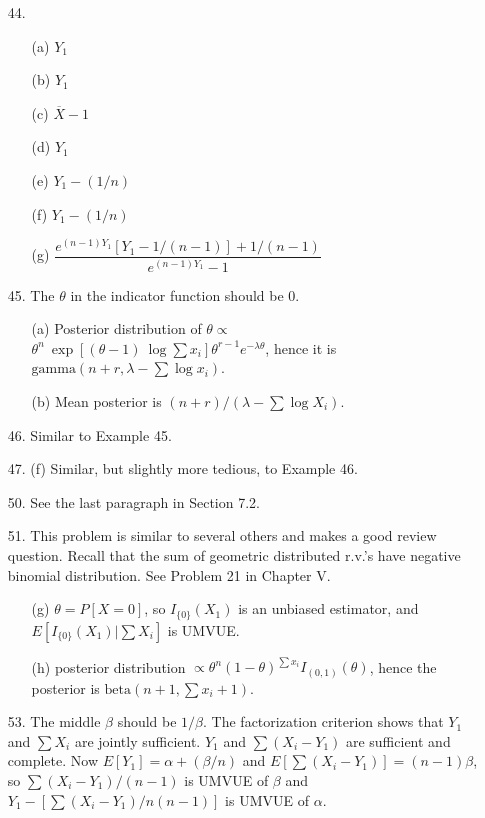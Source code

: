\begin{enumerate}
	\item[44.] \begin{enumerate}
		\item[(a)] $Y_1$
		\item[(b)] $Y_1$
		\item[(c)] $\overline{X}-1$
		\item[(d)] $Y_1$
		\item[(e)] $Y_1 - (1/n)$
		\item[(f)] $Y_1 - (1/n)$
		\item[(g)] $\dfrac{e^{(n-1)Y_1}[Y_1-1/(n-1)] + 1/(n-1)}{e^{(n-1)Y_1} - 1}$
	\end{enumerate}

	\newpage
	
	\item[45.] The $\theta$ in the indicator function should be 0.
	\begin{enumerate}
		\item[(a)] Posterior distribution of $\theta \propto$ \\
		$ \theta^n\ \exp[(\theta-1)\ \log\sum x_i]\theta^{r-1}e^{-\lambda\theta}$, hence it is $\mbox{gamma}(n+r, \lambda-\sum \log x_i)$.
		\item[(b)] Mean posterior is $(n+r)/(\lambda - \sum\log X_i)$. 
	\end{enumerate}
  
  	\item[46.] Similar to Example 45.
  	
  	\item[47.] (f) Similar, but slightly more tedious, to Example 46. 
  	
  	\item[50.] See the last paragraph in Section 7.2.	
  
    \item[51.] This problem is similar to several others and makes a good review question.  Recall that the sum of geometric distributed r.v.'s have negative binomial distribution. See Problem 21 in Chapter V.
    \begin{enumerate}
    	\item[(g)] $\theta=P[X=0]$, so $I_{\{0\}}(X_1)$ is an unbiased estimator, and $E[I_{\{0\}}(X_1)\vert \sum X_i]$ is UMVUE.
    	\item[(h)] posterior distribution $\propto \theta^n(1-\theta)^{\sum x_i}I_{(0,1)}(\theta)$, hence the posterior is $\mbox{beta}(n+1, \sum x_i +1)$.
    \end{enumerate}	
  
    \item[53.] The middle $\beta$ should be $1/\beta$. The factorization criterion shows that $Y_1$ and $\sum X_i$ are jointly sufficient.  $Y_1$ and $\sum (X_i-Y_1)$ are sufficient and complete. Now $E[Y_1] = \alpha + (\beta/n)$ and $E[\sum(X_i-Y_1)] = (n-1)\beta$, so $\sum(X_i-Y_1)/(n-1)$ is UMVUE of $\beta$ and $Y_1 - [\sum(X_i-Y_1)/n(n-1)]$ is UMVUE of $\alpha$.


\end{enumerate}
